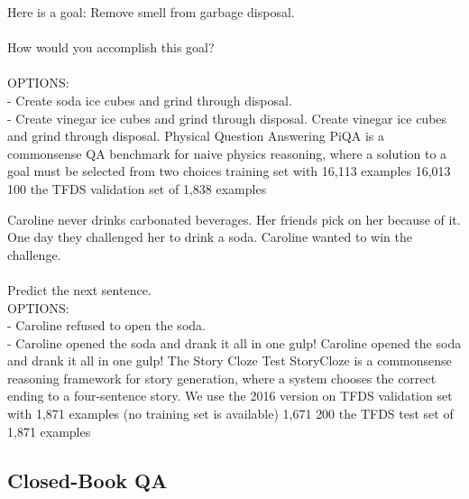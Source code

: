 \taskio
{Here is a goal: Remove smell from garbage disposal.\\\\How would you accomplish this goal?\\\\OPTIONS:\\- Create soda ice cubes and grind through disposal.\\- Create vinegar ice cubes and grind through disposal.}
{Create vinegar ice cubes and grind through disposal.}
{
    \taskdescription
    {Physical Question Answering} %
    {PiQA} %
    {\citep{Bisk2020}} %
    {is a commonsense QA benchmark for naive physics reasoning, where a solution to a goal must be selected from two choices} %
    {training set with 16,113 examples} %
    {16,013} %
    {100} %
    {the TFDS validation set of 1,838 examples} %
}

\taskio
{Caroline never drinks carbonated beverages. Her friends pick on her because of it. One day they challenged her to drink a soda. Caroline wanted to win the challenge.\\\\Predict the next sentence.\\OPTIONS:\\- Caroline refused to open the soda.\\- Caroline opened the soda and drank it all in one gulp!}
{Caroline opened the soda and drank it all in one gulp!}
{
    \taskdescription
    {The Story Cloze Test} %
    {StoryCloze} %
    {\citep{mostafazadeh-etal-2016-corpus}} %
    {is a commonsense reasoning framework for story generation, where a system chooses the correct ending to a four-sentence story. We use the 2016 version on TFDS} %
    {validation set with 1,871 examples (no training set is available)} %
    {1,671} %
    {200} %
    {the TFDS test set of 1,871 examples} %
}












\clearpage 
\subsection{Closed-Book QA}\label{appen:b-open-qa}

